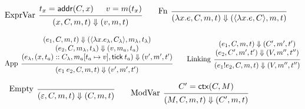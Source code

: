 \documentclass[acmsmall,screen,review]{acmart}
\theoremstyle{definition}
\newcommand*{\cons}{::}
\newcommand*{\mem}{m}
\newcommand*{\link}[2]{{#1}\mathtt{!}{#2}}
\newcommand*{\addr}{\mathsf{addr}}
\newcommand*{\tick}{\mathsf{tick}}
\newcommand*{\modctx}{\mathsf{ctx}}
\begin{document}
\begin{figure}[h!]
  \begin{flushright}\fbox{$(e,C,\mem,t)\Downarrow(V,\mem',t')$}\end{flushright}
  \vspace{0pt} %
  \footnotesize
  \[
    \begin{prooftree}
      \hypo{t_{x}=\addr(C,x)}
      \hypo{v=\mem(t_{x})}
      \infer[left label=ExprVar]2{
      (x, C, \mem, t)
      \Downarrow
      (v, \mem, t)
      }
    \end{prooftree}\qquad
    \begin{prooftree}
      \infer[left label=Fn]0{
      (\lambda x.e, C, \mem, t)
      \Downarrow
      (\langle\lambda x.e, C\rangle, \mem, t)
      }
    \end{prooftree}
  \]

  \[
    \begin{prooftree}
      \hypo{
        \begin{matrix}
          (e_{1}, C, \mem, t)
          \Downarrow
          (\langle\lambda x.e_{\lambda}, C_{\lambda}\rangle, \mem_{\lambda}, t_{\lambda}) \\
          (e_{2}, C, \mem_{\lambda}, t_{\lambda})
          \Downarrow
          (v, \mem_{a}, t_{a})                                                            \\
          (e_{\lambda}, (x, t_{a})\cons C_{\lambda}, \mem_{a}[t_{a}\mapsto v], \tick\:t_{a})
          \Downarrow
          (v', \mem',t')
        \end{matrix}
      }
      \infer[left label={App}]1{
      (e_{1}\:e_{2}, C, \mem, t)
      \Downarrow
      (v', \mem',t')
      }
    \end{prooftree}\qquad
    \begin{prooftree}
      \hypo{
        \begin{matrix}
          (e_{1}, C, \mem, t)
          \Downarrow
          (C', \mem', t') \\
          (e_{2}, C', \mem', t')
          \Downarrow
          (V, \mem'', t'')
        \end{matrix}
      }
      \infer[left label=Linking]1{
      (\link{e_{1}}{e_{2}}, C, \mem, t)
      \Downarrow
      (V, \mem'', t'')
      }
    \end{prooftree}
  \]

  \[
    \begin{prooftree}
      \infer[left label=Empty]0{
      (\varepsilon, C, \mem, t)
      \Downarrow
      (C, \mem, t)
      }
    \end{prooftree}\qquad
    \begin{prooftree}
      \hypo{C'=\modctx(C,M)}
      \infer[left label=ModVar]1{
      (M, C, \mem, t)
      \Downarrow
      (C', \mem, t)
      }
    \end{prooftree}
  \]


\end{figure}
\end{document}
